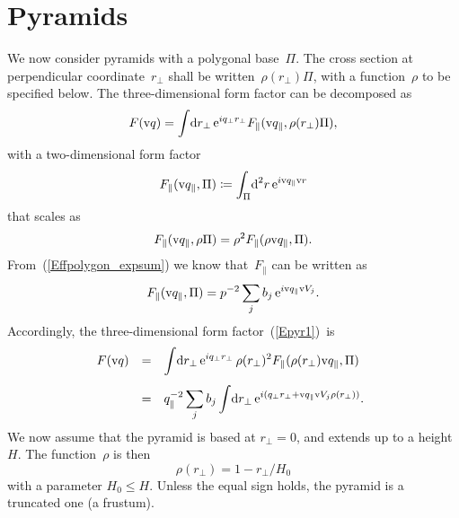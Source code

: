\section{Pyramids}

%
%
%
%

We now consider pyramids with a polygonal base~$\Pi$.
The cross section at perpendicular coordinate~$r_\perp$
shall be written~$\rho(r_\perp)\Pi$,
with a function~$\rho$ to be specified below.
The three-dimensional form factor can be decomposed as
\begin{equation}\label{Epyr1}
  F(\text{v}{q})
  = \int\!\text{d} r_\perp\,\text{e}^{iq_\perp r_\perp} F_\parallel(\text{v}{q}_\parallel,\rho(r_\perp)\Pi),
\end{equation}
with a two-dimensional form factor
\begin{equation}
  F_\parallel(\text{v}{q}_\parallel,\Pi) \coloneqq \int_\Pi\!\text{d}^2r\,\text{e}^{i\text{v}{q}_\parallel\text{v}{r}}
\end{equation}
that scales as
\begin{equation}
  F_\parallel(\text{v}{q}_\parallel,\rho\Pi) = \rho^2 F_\parallel(\rho\text{v}{q}_\parallel,\Pi).
\end{equation}
From~(\ref{Effpolygon_expsum}) we know that~$F_\parallel$ can be written as
\begin{equation}
  F_\parallel(\text{v}{q}_\parallel,\Pi)=p^{-2}\sum_j b_j\, \text{e}^{i\text{v}{q}_\parallel \text{v}{V}_j}.
\end{equation}
Accordingly, the three-dimen\-sional form factor~(\ref{Epyr1})~is
\begin{equation}
  \begin{array}{@{}lcl}
  F(\q)
  &=& \displaystyle
       \int\!\d r_\perp\,\e^{iq_\perp r_\perp}\,\rho(r_\perp)^2 F_\parallel(\rho(r_\perp)\q_\parallel,\Pi)
\\[3ex]
  &=& \displaystyle
      q_\parallel^{-2}  \sum_j b_j
      \int\!\d r_\perp\,\e^{i(q_\perp r_\perp+\q_\parallel \V_j\rho(r_\perp))}.
  \end{array}
\end{equation}
We now assume that the pyramid is based at $r_\perp=0$,
and extends up to a height~$H$.
The function~$\rho$ is then
\begin{equation}
  \rho(r_\perp) = 1-r_\perp/H_0
\end{equation}
with a parameter $H_0\le H$.
Unless the equal sign holds,
the pyramid is a truncated one (a frustum).
